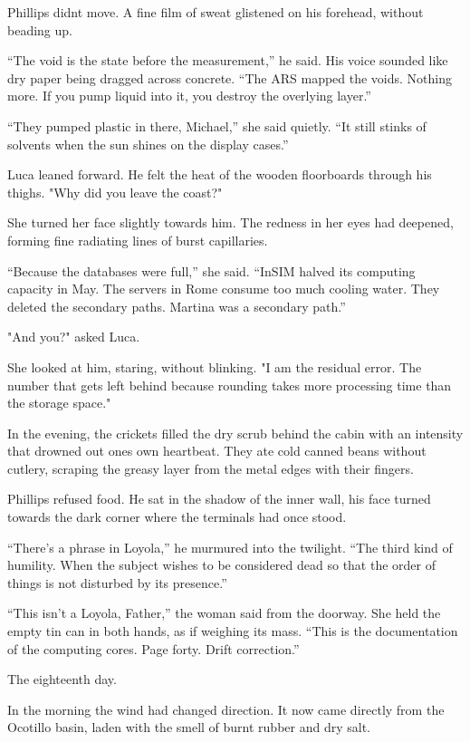 \documentclass[
  ngerman,
]{article}
\begin{document}
Phillips didn\textquotesingle t move. A fine film of sweat glistened on
his forehead, without beading up.

``The void is the state before the measurement,'' he said. His voice
sounded like dry paper being dragged across concrete. ``The ARS mapped
the voids. Nothing more. If you pump liquid into it, you destroy the
overlying layer.''

``They pumped plastic in there, Michael,'' she said quietly. ``It still
stinks of solvents when the sun shines on the display cases.''

Luca leaned forward. He felt the heat of the wooden floorboards through
his thighs. "Why did you leave the coast?"

She turned her face slightly towards him. The redness in her eyes had
deepened, forming fine radiating lines of burst capillaries.

``Because the databases were full,'' she said. ``InSIM halved its
computing capacity in May. The servers in Rome consume too much cooling
water. They deleted the secondary paths. Martina was a secondary path.''

"And you?" asked Luca.

She looked at him, staring, without blinking. "I am the residual error.
The number that gets left behind because rounding takes more processing
time than the storage space."

In the evening, the crickets filled the dry scrub behind the cabin with
an intensity that drowned out one\textquotesingle s own heartbeat. They
ate cold canned beans without cutlery, scraping the greasy layer from
the metal edges with their fingers.

Phillips refused food. He sat in the shadow of the inner wall, his face
turned towards the dark corner where the terminals had once stood.

``There's a phrase in Loyola,'' he murmured into the twilight. ``The
third kind of humility. When the subject wishes to be considered dead so
that the order of things is not disturbed by its presence.''

``This isn't a Loyola, Father,'' the woman said from the doorway. She
held the empty tin can in both hands, as if weighing its mass. ``This is
the documentation of the computing cores. Page forty. Drift
correction.''

The eighteenth day.

In the morning the wind had changed direction. It now came directly from
the Ocotillo basin, laden with the smell of burnt rubber and dry salt.
\end{document}
